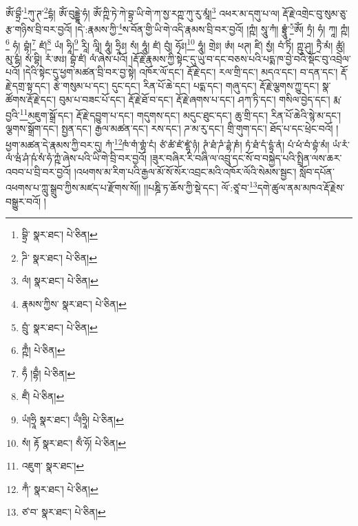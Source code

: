 ཨོཾ་བྷྲྀ་\footnote{བྷྲི་  སྣར་ཐང་།  པེ་ཅིན། }ཀུ་ཊ་\footnote{ཌི་  སྣར་ཐང་།  པེ་ཅིན། }དྷཾ། ཨོཾ་བུདྡྷེ་ཧཾ། ཨོཾ་ཀྵི་ཏེ་ཀེ་བྷྲ་ཡི་གེ་ཀ་སྱ་རཀྵ་ཀུ་རུ་མཱཾ།\footnote{ལཾ།  སྣར་ཐང་།  པེ་ཅིན། } འཕར་མ་དགུ་པ་ལ། རྡོ་རྗེ་འགྲེང་བུ་སུམ་ཅུ་རྩ་གཉིས་བྲི་བར་བྱའོ། །དེ་:རྣམས་ཀྱི་\footnote{རྣམས་ཀྱིས་  སྣར་ཐང་།  པེ་ཅིན། }ས་བོན་གྱི་ཡི་གེ་འདི་རྣམས་བྲི་བར་བྱའོ། །ཀྵཾ། སཱུ་ཀཾ། བྷྲཱུཾ་\footnote{བྲུཾ་  སྣར་ཐང་།  པེ་ཅིན། }ཨོཾ། ཏྲཾ། ཧཾ། ཀཱ། ཀྵཾ།\footnote{ཀྵྃ།  པེ་ཅིན། } ཧཾ། བྷཾ།\footnote{ཧྃ །བྷྃ།  པེ་ཅིན། } ཛཾ།\footnote{ཛྃ།  པེ་ཅིན། } ཡཾ། ཧཱི།\footnote{ཡཾ།ཧྲཱི  སྣར་ཐང་། ཡྃ།ཧྲཱི།  པེ་ཅིན། } རཱི། ལཱི། ཧཱུཾ། ཧྲཱིཿ། སཾ། ཧཱུཾ། ཛཾ། བུཾ། ཧོཿ།\footnote{སཾ། རྟོ  སྣར་ཐང་། སྃ་ཧོ།  པེ་ཅིན། } ཧཱུཾ། གྲེཿ། ཨཾ། ཕཊ། ཛི། སྱཾ། བཾ་ཏིཾ། ཀྵུ་ཤུ། ཏྲཻ་མཾ། ཚུཾ། མུ་ངྷཾ། སཾ་བྷི། རཾ་ཨཿ། བྷྲཾ་ཛཾ། ལཾ་ཞེས་པའོ། །རྡོ་རྗེ་རྣམས་ཀྱི་སྟེང་དུ་ཡུ་བ་དང་བཅས་པའི་པདྨ་ཁ་བྱེ་བའི་སྡོང་བུ་འབྲེལ་པའོ། །དེའི་སྟེང་དུ་ཕྱག་མཚན་བྲི་བར་བྱ་སྟེ། འཁོར་ལོ་དང་། རྡོ་རྗེ་དང་། རལ་གྲི་དང་། མདའ་དང་། བ་དན་དང་། རྡོ་རྗེ་དགྲ་སྟ་དང་། རྩེ་གསུམ་པ་དང་། དུང་དང་། རིན་པོ་ཆེ་དང་། པདྨ་དང་། གཞུ་དང་། རྡོ་རྗེ་ལྕགས་ཀྱུ་དང་། སྣ་ཚོགས་རྡོ་རྗེ་དང་། བུམ་པ་བཟང་པོ་དང་། རྡོ་རྗེ་ཐོ་བ་དང་། རྡོ་རྗེ་ཞགས་པ་དང་། ཤཀ་ཏི་དང་། གསིལ་བྱེད་དང་། རྨ་བྱའི་\footnote{འཇུག་  སྣར་ཐང་། }མཇུག་སྒྲོ་དང་། རྡོ་རྗེ་དབྱུག་པ་དང་། གདུགས་དང་། མདུང་ཐུང་དང་། ཆུ་གྲི་དང་། རིན་པོ་ཆེའི་སྙེ་མ་དང་། ལྕགས་སྒྲོག་དང་། སྤྱན་དང་། རྒྱལ་མཚན་དང་། རས་དང་། ཌ་མ་རུ་དང་། གྲི་གུག་དང་། ཐོད་པ་དང་ཕྲེང་བའོ། །ཕྱག་མཚན་དེ་རྣམས་ཀྱི་བར་དུ། ཀཾ་\footnote{ཀྃ་  སྣར་ཐང་།  པེ་ཅིན། }ཁཾ་གཾ་གྷཾ་ངཾ། ཙཾ་ཚཾ་ཛཾ་ཛྷཾ་ཉཾ། ཊཾ་ཐཾ་ཌཾ་ཌྷཾ་ཎཾ། ཏཾ་ཐཾ་དཾ་དྷཾ་ནཾ། པཾ་ཕཾ་བཾ་བྷཾ་མཾ། ཡཾ་རཾ་ལཾ་ཝཾ་ཤཾ་ཥཾ་སཾ་ཧཾ་ཀྵཾ་ཞེས་པའི་ཡི་གེ་བྲི་བར་བྱའོ། །ཟུར་བཞིར་རི་བཞི་ལ་འབྲུ་དང་སོ་བ་བསྐྱེད་པའི་སྤྲིན་ལས་ཆར་འབབ་པ་བྲི་བར་བྱའོ། །འཕགས་མ་རིག་པའི་རྒྱལ་མོ་སོ་སོར་འབྲང་མའི་འཁོར་ལོའི་སེམས་སྦྱང་། སློབ་དཔོན་འཕགས་པ་ཀླུ་སྒྲུབ་ཀྱིས་མཛད་པ་རྫོགས་སོ།། །།པཎྜི་ཏ་ཆོས་ཀྱི་སྡེ་དང་། ལོ་:ཙཱ་བ་\footnote{ཙ་བ་  སྣར་ཐང་།  པེ་ཅིན། }དགེ་ཚུལ་ནམ་མཁའ་རྡོ་རྗེས་བསྒྱུར་བའོ། ། 